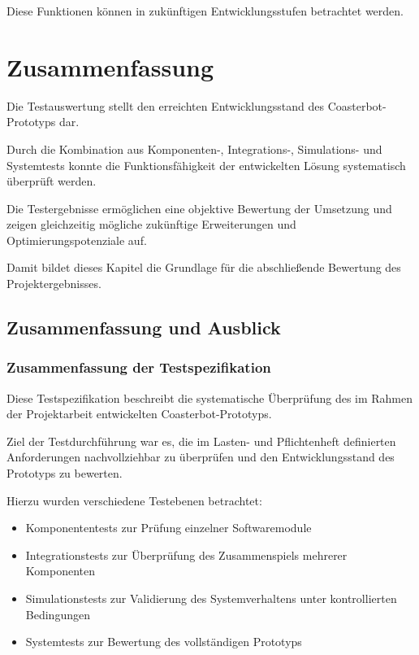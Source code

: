 \documentclass[
  a4paper,
  12pt,
  DIV=12,        %
  parskip=half,  %
  headings=small %
]{scrartcl}
\theoremstyle{definition}
\providecommand{\tightlist}{%
  \setlength{\itemsep}{0pt}\setlength{\parskip}{0pt}}
\theoremstyle{definition}
\begin{document}
Diese Funktionen können in zukünftigen Entwicklungsstufen betrachtet
werden.

\section{Zusammenfassung}\label{zusammenfassung-2}

Die Testauswertung stellt den erreichten Entwicklungsstand des
Coasterbot-Prototyps dar.

Durch die Kombination aus Komponenten-, Integrations-, Simulations- und
Systemtests konnte die Funktionsfähigkeit der entwickelten Lösung
systematisch überprüft werden.

Die Testergebnisse ermöglichen eine objektive Bewertung der Umsetzung
und zeigen gleichzeitig mögliche zukünftige Erweiterungen und
Optimierungspotenziale auf.

Damit bildet dieses Kapitel die Grundlage für die abschließende
Bewertung des Projektergebnisses.

\subsection{Zusammenfassung und
Ausblick}\label{zusammenfassung-und-ausblick}

\subsubsection{Zusammenfassung der
Testspezifikation}\label{zusammenfassung-der-testspezifikation}

Diese Testspezifikation beschreibt die systematische Überprüfung des im
Rahmen der Projektarbeit entwickelten Coasterbot-Prototyps.

Ziel der Testdurchführung war es, die im Lasten- und Pflichtenheft
definierten Anforderungen nachvollziehbar zu überprüfen und den
Entwicklungsstand des Prototyps zu bewerten.

Hierzu wurden verschiedene Testebenen betrachtet:

\begin{itemize}
\tightlist
\item
  Komponententests zur Prüfung einzelner Softwaremodule
\item
  Integrationstests zur Überprüfung des Zusammenspiels mehrerer
  Komponenten
\item
  Simulationstests zur Validierung des Systemverhaltens unter
  kontrollierten Bedingungen
\item
  Systemtests zur Bewertung des vollständigen Prototyps
\end{itemize}
\end{document}
